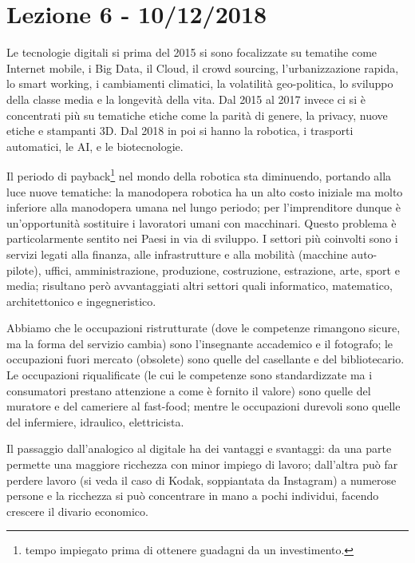 \documentclass[a4page, 11pt]{article}
\begin{document}
\section*{Lezione 6 - 10/12/2018}
Le tecnologie digitali si prima del 2015 si sono focalizzate su tematihe come Internet mobile, i Big Data, il Cloud, il crowd sourcing, l'urbanizzazione rapida, lo smart working, i cambiamenti climatici, la volatilità geo-politica, lo sviluppo della classe media e la longevità della vita.
Dal 2015 al 2017 invece ci si è concentrati più su tematiche etiche come la parità di genere, la privacy, nuove etiche e stampanti 3D.
Dal 2018 in poi si hanno la robotica, i trasporti automatici, le AI, e le biotecnologie.

Il periodo di payback\footnote{tempo impiegato prima di ottenere guadagni da un investimento.} nel mondo della robotica sta diminuendo, portando alla luce nuove tematiche: la manodopera robotica ha un alto costo iniziale ma molto inferiore alla manodopera umana nel lungo periodo; per l'imprenditore dunque è un'opportunità sostituire i lavoratori umani con macchinari.
Questo problema è particolarmente sentito nei Paesi in via di sviluppo.
I settori più coinvolti sono i servizi legati alla finanza, alle infrastrutture e alla mobilità (macchine auto-pilote), uffici, amministrazione, produzione, costruzione, estrazione, arte, sport e media; risultano però avvantaggiati altri settori quali informatico, matematico, architettonico e ingegneristico.

Abbiamo che le occupazioni ristrutturate (dove le competenze rimangono sicure, ma la forma del servizio cambia) sono l'insegnante accademico e il fotografo; le occupazioni fuori mercato (obsolete) sono quelle del casellante e del bibliotecario.
Le occupazioni riqualificate (le cui le competenze sono standardizzate ma i consumatori prestano attenzione a come è fornito il valore) sono quelle del muratore e del cameriere al fast-food; mentre le occupazioni durevoli sono quelle del infermiere, idraulico, elettricista.

Il passaggio dall'analogico al digitale ha dei vantaggi e svantaggi: da una parte permette una maggiore ricchezza con minor impiego di lavoro; dall'altra può far perdere lavoro (si veda il caso di Kodak, soppiantata da Instagram) a numerose persone e la ricchezza si può concentrare in mano a pochi individui, facendo crescere il divario economico.
%
	 
\end{document}
